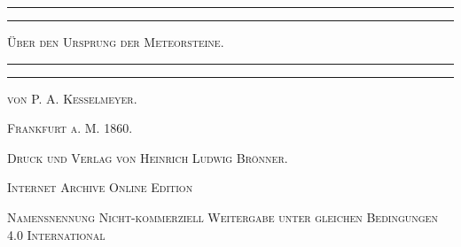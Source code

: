\documentclass[a4paper, 8pt, oneside, polutonikogreek, german]{article}
\begin{document}
\begin{titlepage} %
	\centering %

	
	\rule{\textwidth}{1.6pt}\vspace*{-\baselineskip}\vspace*{2pt} %
	\rule{\textwidth}{0.4pt} %
	
	\vspace{1\baselineskip} %
	
	{\scshape\LARGE Über den Ursprung der Meteorsteine.}
	
	\vspace{1\baselineskip} %

	\rule{\textwidth}{0.4pt}\vspace*{-\baselineskip}\vspace{3.2pt} %
	\rule{\textwidth}{1.6pt} %
	
	\vspace{1\baselineskip} %
	
	
	{\scshape von P. A. Kesselmeyer.} %
	
	\vspace*{1\baselineskip} %
    
    \vspace*{\fill}

	\vspace{1\baselineskip}

	{\small\scshape Frankfurt a. M. 1860.}
	
	{\small\scshape{Druck und Verlag von Heinrich Ludwig Brönner.}}
	
	\vspace{0.5\baselineskip} %

    \scshape Internet Archive Online Edition  %
	
	{\scshape\small Namensnennung Nicht-kommerziell Weitergabe unter gleichen Bedingungen 4.0 International} %
\end{titlepage}
\setlength{\parskip}{1mm plus1mm minus1mm}
\clearpage
\tableofcontents
\clearpage
\end{document}
